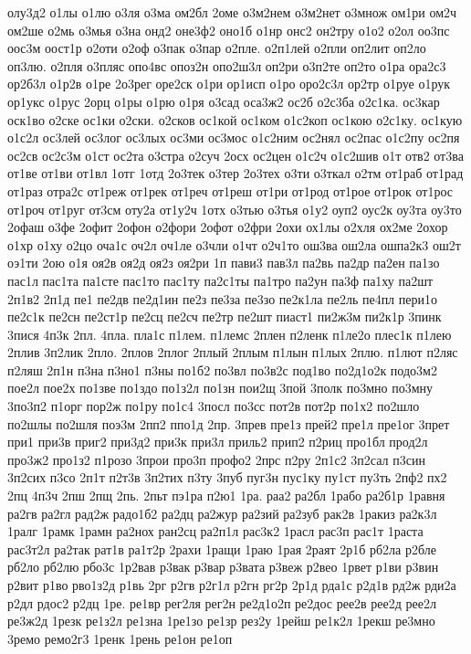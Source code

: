 олу3д2
о1лы
о1лю
о3ля
о3ма
ом2бл
2оме
о3м2нем
о3м2нет
о3множ
ом1ри
ом2ч
ом2ше
о2мь
о3мья
о3на
онд2
оне3ф2
оно1б
о1нр
онс2
он2тру
о1о2
о2ол
оо3пс
оос3м
оост1р
о2оти
о2оф
о3пак
о3пар
о2пле.
о2п1лей
о2пли
оп2лит
оп2ло
оп3лю.
о2пля
о3пляс
опо4вс
опоз2н
опо2ш3л
оп2ри
о3п2те
оп2то
о1ра
ора2с3
ор2б3л
о1р2в
о1ре
2о3рег
оре2ск
о1ри
ор1исп
о1ро
оро2с3л
ор2тр
о1руе
о1рук
ор1укс
о1рус
2орц
о1ры
о1рю
о1ря
о3сад
оса3ж2
ос2б
о2с3ба
о2с1ка.
ос3кар
оск1во
о2ске
ос1ки
о2ски.
о2сков
ос1кой
ос1ком
о1с2коп
ос1кою
о2с1ку.
ос1кую
о1с2л
ос3лей
ос3лог
ос3лых
ос3ми
ос3мос
о1с2ним
ос2нял
ос2пас
о1с2пу
ос2пя
ос2св
ос2с3м
о1ст
ос2та
о3стра
о2суч
2осх
ос2цен
о1с2ч
о1с2шив
о1т
отв2
от3ва
от1ве
от1ви
от1вл
1отг
1отд
2о3тек
о3тер
2о3тех
о3ти
о3ткал
о2тм
от1раб
от1рад
от1раз
отра2с
от1реж
от1рек
от1реч
от1реш
от1ри
от1род
от1рое
от1рок
от1рос
от1роч
от1руг
от3см
оту2а
от1у2ч
1отх
о3тью
о3тья
о1у2
оуп2
оус2к
оу3та
оу3то
2офаш
о3фе
2офит
2офон
о2фори
2офот
о2фри
2охи
ох1лы
о2хля
ох2ме
2охор
о1хр
о1ху
о2цо
оча1с
оч2л
оч1ле
о3чли
о1чт
о2ч1то
ош3ва
ош2ла
ошпа2к3
ош2т
оэ1ти
2ою
о1я
оя2в
оя2д
оя2з
оя2ри
1п
пави3
пав3л
па2вь
па2др
па2ен
па1зо
пас1л
пас1та
па1сте
пас1то
пас1ту
па2с1ты
па1тро
па2ун
па3ф
па1ху
па2шт
2п1в2
2п1д
пе1
пе2дв
пе2д1ин
пе2з
пе3за
пе3зо
пе2к1ла
пе2ль
пе4пл
пери1о
пе2с1к
пе2сн
пе2ст1р
пе2сц
пе2сч
пе2тр
пе2шт
пиаст1
пи2ж3м
пи2к1р
3пинк
3пися
4п3к
2пл.
4пла.
пла1с
п1лем.
п1лемс
2плен
п2ленк
п1ле2о
плес1к
п1лею
2плив
3п2лик
2пло.
2плов
2плог
2плый
2плым
п1лын
п1лых
2плю.
п1лют
п2ляс
п2ляш
2п1н
п3на
п3но1
п3ны
по1б2
по3вл
по3в2с
под1во
по2д1о2к
подо3м2
пое2л
пое2х
по1зве
по1здо
по1з2л
по1зн
пои2щ
3пой
3полк
по3мно
по3мну
3по3п2
п1орг
пор2ж
по1ру
по1с4
3посл
по3сс
пот2в
пот2р
по1х2
по2шло
по2шлы
по2шля
поэ3м
2пп2
ппо1д
2пр.
3прев
пре1з
прей2
пре1л
пре1ог
3прет
при1
при3в
приг2
при3д2
при3к
при3л
приль2
прип2
п2риц
про1бл
прод2л
про3ж2
про1з2
п1розо
3прои
про3п
профо2
2прс
п2ру
2п1с2
3п2сал
п3син
3п2сих
п3со
2п1т
п2т3в
3п2тих
п3ту
3пуб
пуг3н
пус1ку
пу1ст
пу3ть
2пф2
пх2
2пц
4п3ч
2пш
2пщ
2пь.
2пьт
пэ1ра
п2ю1
1ра.
раа2
ра2бл
1рабо
ра2б1р
1равня
ра2гв
ра2гл
рад2ж
радо1б2
ра2дц
ра2жур
ра2зий
ра2зуб
рак2в
1ракиз
ра2к3л
1ралг
1рамк
1рамн
ра2нох
ран2сц
ра2п1л
рас3к2
1расл
рас3п
рас1т
1раста
рас3т2л
ра2так
рат1в
ра1т2р
2рахи
1ращи
1раю
1рая
2раят
2р1б
рб2ла
р2бле
рб2ло
рб2лю
рбо3с
1р2вав
р3вак
р3вар
р3вата
р3веж
р2вео
1рвет
р1ви
р3вин
р2вит
р1во
рво1з2д
р1вь
2рг
р2гв
р2г1л
р2гн
рг2р
2р1д
рда1с
р2д1в
рд2ж
рди2а
р2дл
рдос2
р2дц
1ре.
ре1вр
рег2ля
рег2н
ре2д1о2п
ре2дос
рее2в
рее2д
рее2л
ре3ж2д
1резк
ре1з2л
ре1зна
1ре1зо
ре1зр
рез2у
1рейш
ре1к2л
1рекш
ре3мно
3ремо
ремо2г3
1ренк
1рень
ре1он
ре1оп
